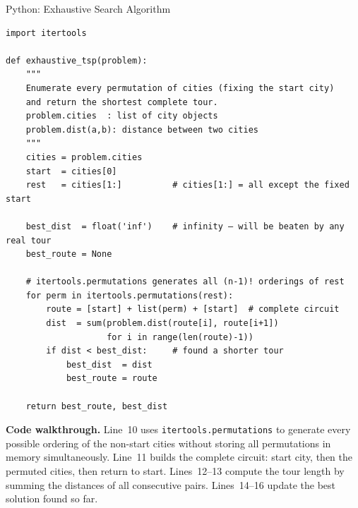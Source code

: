 \documentclass[aspectratio=169,10pt]{beamer}
\begin{document}
\begin{frame}[fragile]{Python: Exhaustive Search Algorithm}

\begin{lstlisting}[caption={Exhaustive search --- Python translation of the book's Java Listing 1.1}]
import itertools

def exhaustive_tsp(problem):
    """
    Enumerate every permutation of cities (fixing the start city)
    and return the shortest complete tour.
    problem.cities  : list of city objects
    problem.dist(a,b): distance between two cities
    """
    cities = problem.cities
    start  = cities[0]
    rest   = cities[1:]          # cities[1:] = all except the fixed start

    best_dist  = float('inf')    # infinity — will be beaten by any real tour
    best_route = None

    # itertools.permutations generates all (n-1)! orderings of rest
    for perm in itertools.permutations(rest):
        route = [start] + list(perm) + [start]  # complete circuit
        dist  = sum(problem.dist(route[i], route[i+1])
                    for i in range(len(route)-1))
        if dist < best_dist:     # found a shorter tour
            best_dist  = dist
            best_route = route

    return best_route, best_dist
\end{lstlisting}

\textbf{Code walkthrough.}
Line~10 uses \texttt{itertools.permutations} to generate every possible
ordering of the non-start cities without storing all permutations in
memory simultaneously.  Line~11 builds the complete circuit: start city,
then the permuted cities, then return to start.  Lines~12--13 compute
the tour length by summing the distances of all consecutive pairs.
Lines~14--16 update the best solution found so far.

\end{frame}
\end{document}
